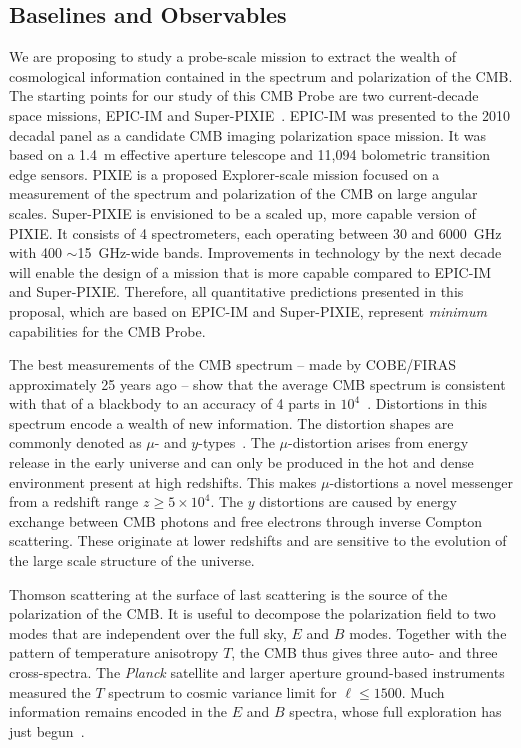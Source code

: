 
\subsection{Baselines and Observables}
\label{sec:observables}

\vspace{-0.05in}

We are proposing to study a probe-scale mission to extract the wealth 
of cosmological information contained in the spectrum and polarization of the \ac{CMB}. 
The starting points for our study of this CMB Probe are two current-decade space missions, 
EPIC-IM and Super-PIXIE~\cite{bock2009, Kogut2011PIXIE}. EPIC-IM was presented 
to the 2010 decadal panel as a candidate \ac{CMB} imaging polarization space mission. 
It was based on a 1.4~m effective aperture telescope and 11,094 bolometric transition edge sensors. 
PIXIE is a proposed Explorer-scale mission focused on a measurement of the spectrum 
and polarization of the CMB on large angular scales. Super-PIXIE is envisioned to be a scaled up, 
more capable version of PIXIE. It consists of 4 spectrometers, each operating between 
30 and 6000~GHz with 400 $\sim$15~GHz-wide bands. Improvements in technology by the next decade will enable 
the design of a mission that is more capable compared to EPIC-IM and Super-PIXIE. Therefore, all 
quantitative predictions presented in this proposal, which are based on EPIC-IM and Super-PIXIE, 
represent {\it minimum} capabilities for the CMB Probe. 

The best measurements of the \ac{CMB} spectrum -- made by COBE/FIRAS approximately 25 years ago --
show that the average CMB spectrum is consistent with that of a blackbody to an accuracy of 4 parts 
in $10^{4}$~\cite{Mather1994, Fixsen1996}. Distortions in this spectrum encode a wealth of new information.
The distortion shapes are commonly denoted as $\mu$- and $y$-types~\cite{Zeldovich1969, Sunyaev1970mu}. The 
$\mu$-distortion arises from energy release in the early universe and can only be produced in the hot and dense 
environment present at high redshifts. This makes $\mu$-distortions a novel messenger from a redshift 
range $ z \geq 5\times10^{4} $. The $y$ distortions are caused by 
energy exchange between \ac{CMB} photons and free electrons through inverse Compton 
scattering. These originate at lower redshifts and are sensitive to the 
evolution of the large scale structure of the universe. 

Thomson scattering at the surface of last scattering is the source of the polarization of the \ac{CMB}. It is useful 
to decompose the polarization field to two modes that are independent over the full sky, $E$ and $B$ modes. 
Together with the pattern of temperature anisotropy $T$, the \ac{CMB} thus gives three auto- and three cross-spectra. 
The {\it Planck} satellite and larger aperture ground-based instruments measured the $T$ spectrum to cosmic
variance limit for $\ell \leq 1500$. Much information remains encoded in the $E$ and $B$ spectra, whose full exploration 
has just begun~\cite{Hanson2013,PB_BB,bicep2Bmode, bkp2015}.   

